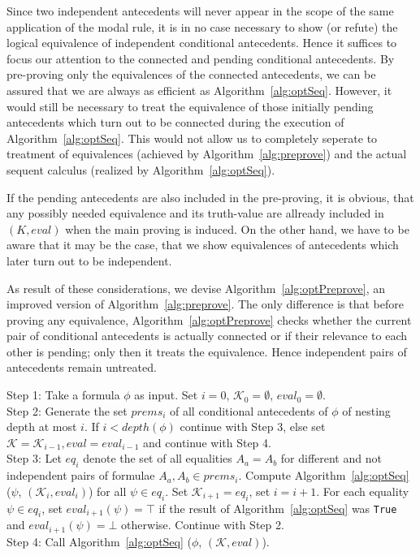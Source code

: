 \documentclass{entcs} \usepackage{entcsmacro}
\begin{document}
Since two independent antecedents will never appear in the scope of the
same application of the modal rule, it is in no case necessary to show (or
refute) the logical equivalence of independent
conditional antecedents. Hence it suffices to focus
our attention to the connected and pending conditional antecedents. By pre-proving only
the equivalences of the connected antecedents, we can be assured that we are 
always as efficient as Algorithm~\ref{alg:optSeq}. However, it would still
be necessary to treat the equivalence of those initially pending antecedents which
turn out to be connected during the execution of Algorithm~\ref{alg:optSeq}.
This would not allow us to completely seperate to treatment of equivalences
(achieved by Algorithm~\ref{alg:preprove}) and the actual sequent calculus (realized by
Algorithm~\ref{alg:optSeq}).

If the pending antecedents are also included in the pre-proving, it is obvious, that
any possibly needed equivalence and its truth-value are allready included in $(K,eval)$
when the main proving is induced. On the other hand, we have to be aware that it
may be the case, that we show equivalences of antecedents which later turn out to
be independent.

As result of these considerations, we devise Algorithm~\ref{alg:optPreprove},
an improved version of Algorithm~\ref{alg:preprove}. The only difference is
that before proving any equivalence, Algorithm~\ref{alg:optPreprove} checks
whether the current pair of conditional antecedents is actually connected or if their
relevance to each other is pending; only then it treats the equivalence. Hence
independent pairs of antecedents remain untreated.


\begin{algorithm}[h]
\begin{alg}
\begin{upshape}
  Step 1: Take a formula $\phi$ as input. Set $i=0$, $\mathcal{K}_0=\emptyset$, $eval_0=\emptyset$.\\
  Step 2: Generate the set $prems_i$ of all conditional antecedents of $\phi$
  of nesting depth at most $i$. If $i<depth(\phi)$ continue
  with Step 3, else set $\mathcal{K}=\mathcal{K}_{i-1}, eval=eval_{i-1}$ and continue with Step 4.\\
  Step 3: Let $eq_i$ denote the set of all equalities $A_a = A_b$ for different and not independent
  pairs of formulae $A_a,A_b\in prems_i$. Compute
  Algorithm~\ref{alg:optSeq} ($\psi$, $(\mathcal{K}_i,eval_i)$) for all $\psi\in eq_i$.
  Set $\mathcal{K}_{i+1} = eq_i$, set $i = i + 1$. For each equality $\psi\in eq_i$,
  set $eval_{i+1}(\psi)=\top$ if the result of Algorithm~\ref{alg:optSeq} was \verb+True+
  and $eval_{i+1}(\psi)=\bot$ otherwise. Continue with Step 2.\\
  Step 4: Call Algorithm~\ref{alg:optSeq} ($\phi$, $(\mathcal{K},eval)$).
\label{alg:optPreprove}
\end{upshape}
\end{alg}
\end{algorithm}
\end{document}
